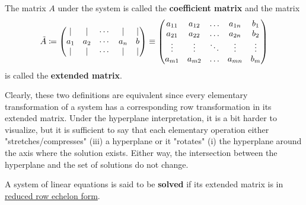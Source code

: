  \begin{definition}
    \label{def:coefficient-matrix}
    The matrix $A$ under the system is called the \textbf{coefficient matrix} and the matrix 
    \begin{equation}
      \Tilde{A} \coloneqq \begin{pmatrix}
      | & | & \cdots & | & | \\
      a_1 & a_2 & \cdots & a_n & b \\
      | & | & \cdots & | & | 
      \end{pmatrix} \equiv \begin{pmatrix}
      a_{1 1} & a_{1 2} & \ldots& a_{1 n} & b_1\\
       a_{2 1} & a_{2 2} & \ldots & a_{2 n} & b_2\\
      \vdots & \vdots & \ddots & \vdots & \vdots\\
       a_{m 1} & a_{m 2} & \ldots & a_{m n} & b_m
      \end{pmatrix}
    \end{equation}
    is called the \textbf{extended matrix}. 
  \end{definition}

  Clearly, these two definitions are equivalent since every elementary transformation of a system has a corresponding row transformation in its extended matrix. Under the hyperplane interpretation, it is a bit harder to visualize, but it is sufficient to say that each elementary operation either "stretches/compresses" (iii) a hyperplane or it "rotates" (i) the hyperplane around the axis where the solution exists. Either way, the intersection between the hyperplane and the set of solutions do not change. 

  \begin{definition}
    \label{def:solved-system}
    A system of linear equations is said to be \textbf{solved} if its extended matrix is in \hyperref[def:reduced-row-echelon-form]{reduced row echelon form}. 
  \end{definition}


